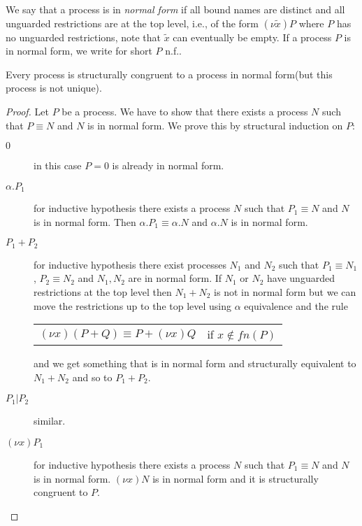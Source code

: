 \begin{definition}
  We say that a process is in \emph{normal form} if all bound names are distinct and all unguarded restrictions are at the top level, i.e., of the form $(\nu \tilde{x})P$ where $P$ has no unguarded restrictions, note that $\tilde{x}$ can eventually be empty. If a process $P$ is in normal form, we write for short $P$ n.f.. 
\end{definition}

\begin{lemma}\label{existenceOfNormalForm}
  Every process is structurally congruent to a process in normal form(but this process is not unique).
  \begin{proof}
    Let $P$ be a process. We have to show that there exists a process $N$ such that $P \equiv N$ and $N$ is in normal form. We prove this by structural induction on $P$:
    \begin{description}
      \item[$0$] 
	in this case $P=0$ is already in normal form.
      \item[$\alpha.P_{1}$] 
	for inductive hypothesis there exists a process $N$ such that $P_{1} \equiv N$ and $N$ is in normal form. Then $\alpha.P_{1} \equiv \alpha.N$ and $\alpha.N$ is in normal form.
      \item[$P_{1}+P_{2}$]
	for inductive hypothesis there exist processes $N_{1}$ and $N_{2}$ such that $P_{1} \equiv N_{1}$, $P_{2} \equiv N_{2}$ and $N_{1}, N_{2}$ are in normal form. If $N_{1}$ or $N_{2}$ have unguarded restrictions at the top level then $N_{1}+N_{2}$ is not in normal form but we can move the restrictions up to the top level using $\alpha$ equivalence and the rule 
	\begin{center}
	  \begin{tabular}{ll}
	      $(\nu x)(P+Q) \equiv P + (\nu x)Q$ 
	    &
	      if $x\notin fn(P)$
	  \end{tabular}
	\end{center}
	and we get something that is in normal form and structurally equivalent to $N_{1}+N_{2}$ and so to $P_{1}+P_{2}$.
      \item[$P_{1}|P_{2}$] similar.
      \item[$(\nu x)P_{1}$] 
	for inductive hypothesis there exists a process $N$ such that $P_{1} \equiv N$ and $N$ is in normal form. $(\nu x)N$ is in normal form and it is structurally congruent to $P$.
    \end{description}
  \end{proof}
\end{lemma}

